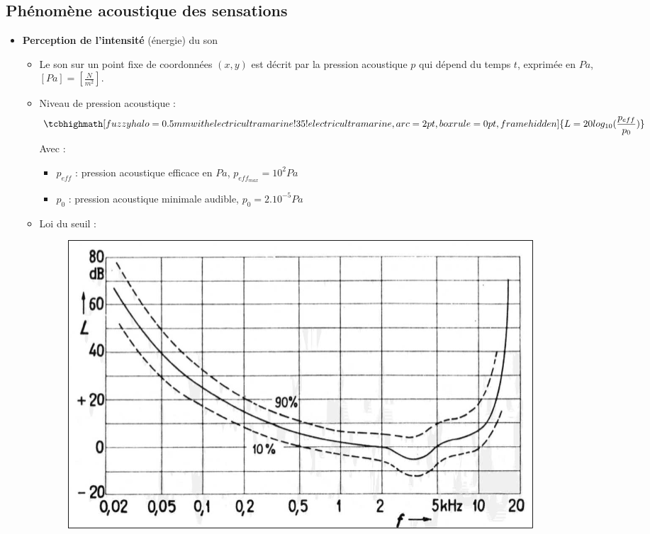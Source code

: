 \subsection{Phénomène acoustique des sensations}
\begin{itemize}
    \item \textbf{Perception de l'intensité} (énergie) du son \newline
        \begin{itemize}
            \item Le son sur un point fixe de coordonnées $(x,y)$ est décrit par la pression acoustique $p$ qui dépend du temps $t$, exprimée en $Pa$, $[Pa]=[\frac{N}{m^{2}}]$.
            \item Niveau de pression acoustique : 
            \begin{equation}
                \normalsize
                \tcbhighmath[fuzzy halo=0.5mm with electricultramarine!35!electricultramarine,arc=2pt,
                boxrule=0pt,frame hidden]{ 
                    L = 20log_{10}(\frac{p_{eff}}{p_{0}})
                } \nonumber
                \normalsize
            \end{equation}
            Avec : 
            \begin{itemize}
                \item $p_{eff}$ : pression acoustique efficace en $Pa$, $p_{eff_{max}} = 10^{2} Pa$
                \item $p_{0}$ : pression acoustique minimale audible, $p_{0} = 2.10^{-5} Pa$
            \end{itemize}
            \item Loi du seuil :
            \begin{figure}[hbt!]
                \centering
                \includegraphics[scale=0.3]{Pics/Loi_du_Seuil.png}

\end{figure}
\end{itemize}
\end{itemize}
